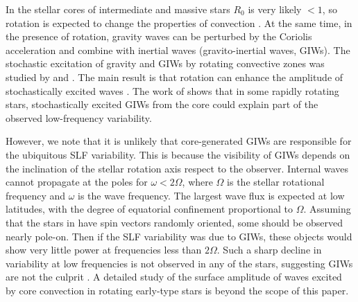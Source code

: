 \documentclass[twocolumn]{aastex63}
\begin{document}
{In the stellar cores of intermediate and massive stars $R_0$ is very likely $<1$, so 
 rotation is expected to change the properties of convection \citep[e.g.][]{Stevenson:1979,Augustson:2019}.
At the same time, in the presence of rotation, gravity waves can be perturbed by the Coriolis acceleration and combine with inertial waves (gravito-inertial waves, GIWs). 
The stochastic excitation of gravity and GIWs by rotating convective zones was studied by \citet{Mathis:2014} and \citet{Augustson:2020}. 
The main result is that rotation can enhance the  amplitude of stochastically excited waves \citep{Mathis:2014}. 
The work of \citet{Neiner:2020} shows that in some rapidly rotating stars, stochastically excited GIWs from the core could explain part of the observed low-frequency variability. 

However, we note that it is unlikely that core-generated GIWs are responsible for the ubiquitous SLF variability. This is because the visibility of GIWs depends on the inclination of the stellar rotation axis respect to the observer. 
Internal waves cannot propagate at the poles for $\omega < 2\Omega$, where $\Omega$ is the stellar rotational frequency  and $\omega$ is the wave frequency. The largest wave flux is expected at low latitudes,
with the degree of  equatorial confinement proportional to $\Omega$.  
Assuming that the stars in \citet{Bowman:2020} have spin vectors randomly oriented, some should be observed nearly pole-on.
Then if the SLF variability was due to GIWs, these objects would show very little power at frequencies less than $2\Omega$. 
Such a sharp decline in variability at low
frequencies is not observed in any of the stars, suggesting GIWs are not the culprit \citep{Lecoanet:2020}. 
A detailed study of the surface amplitude of waves excited by core convection in rotating early-type stars is beyond the scope of this paper. 


}


\end{document}
